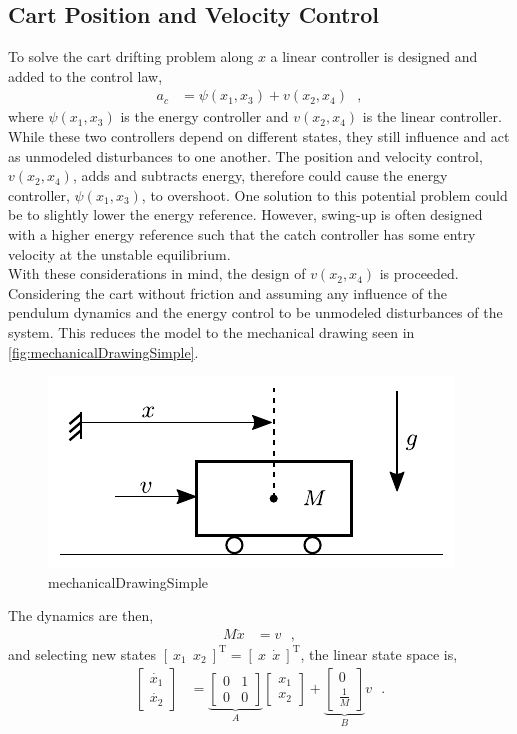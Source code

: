 \subsection{Cart Position and Velocity Control}
To solve the cart drifting problem along $x$ a linear controller is designed and added to the control law,
\begin{align}
  a_c &= \psi(x_1,x_3) + v(x_2,x_4) \ \ \ ,   \label{eq:combiControl} 
\end{align}
where $\psi(x_1,x_3)$ is the energy controller and $v(x_2,x_4)$ is the linear controller. While these two controllers depend on different states, they still influence and act as unmodeled disturbances to one another. The position and velocity control, $v(x_2,x_4)$, adds and subtracts energy, therefore could cause the energy controller, $\psi(x_1,x_3)$, to overshoot. One solution to this potential problem could be to slightly lower the energy reference. However, swing-up is often designed with a higher energy reference such that the catch controller has some entry velocity at the unstable equilibrium.\\
With these considerations in mind, the design of $v(x_2,x_4)$ is proceeded. Considering the cart without friction and assuming any influence of the pendulum dynamics and the energy control to be unmodeled disturbances of the system. This reduces the model to the mechanical drawing seen in \autoref{fig:mechanicalDrawingSimple}.
%
\begin{figure}[H]
  \includegraphics[width=.35\textwidth]{figures/mechanicalDrawingSimple}
  \caption{mechanicalDrawingSimple}
  \label{fig:mechanicalDrawingSimple}
\end{figure}
%
The dynamics are then,
\begin{align}
  M \ddot{x} &=  v \ \ \ ,  \label{eq:simpleDynamics} 
\end{align}
and selecting new states $ [\ x_1\ \ x_2\ ]^\mathrm{T} = [\ x\ \ \dot{x}\ ]^\mathrm{T} $, the linear state space is,\vspace{6pt}
\begin{align}
  \begin{bmatrix}
    \dot{x_1} \\
    \dot{x_2}
  \end{bmatrix}
  &=
  \underbrace{
    \begin{bmatrix}
      0 & 1 \\
      0 & 0
    \end{bmatrix}
  }_{A}
  \begin{bmatrix}
    x_1 \\
    x_2
  \end{bmatrix}
  +
  \underbrace{
    \begin{bmatrix}
      0 \\
      \tfrac{1}{M}
    \end{bmatrix}
  }_{B}
  v
  \label{eq:simpleLinearStateSpace} \ \ \ .
\end{align}
